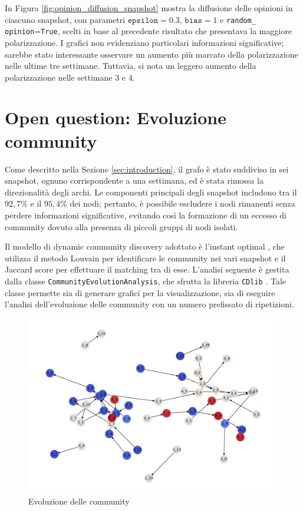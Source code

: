 \documentclass[sigchi]{acmart}
\begin{document}
In Figura \ref{fig:opinion_diffusion_snapshot} mostra la diffusione delle opinioni in ciascuno snapshot, con parametri $\texttt{epsilon}=0.3$, $\texttt{bias}=1$ e \texttt{random\_ opinion}=\texttt{True}, scelti in base al precedente risultato che presentava la maggiore polarizzazione. I grafici non evidenziano particolari informazioni significative; sarebbe stato interessante osservare un aumento più marcato della polarizzazione nelle ultime tre settimane. Tuttavia, si nota un leggero aumento della polarizzazione nelle settimane 3 e 4.

\section{Open question: Evoluzione community} \label{sec:evoluzione_community}
Come descritto nella Sezione \ref{sec:introduction}, il grafo è stato suddiviso in sei snapshot, ognuno corrispondente a una settimana, ed è stata rimossa la direzionalità degli archi. Le componenti principali degli snapshot includono tra il $92,7\%$ e il $95,4\%$ dei nodi; pertanto, è possibile escludere i nodi rimanenti senza perdere informazioni significative, evitando così la formazione di un eccesso di community dovuto alla presenza di piccoli gruppi di nodi isolati.

Il modello di dynamic community discovery adottato è l'instant optimal \cite{greene2010tracking}, che utilizza il metodo Louvain \cite{blondel2008fast} per identificare le community nei vari snapshot e il Jaccard score per effettuare il matching tra di esse. L'analisi seguente è gestita dalla classe \texttt{CommunityEvolutionAnalysis}, che sfrutta la libreria \texttt{CDlib} \cite{rossetti2019cdlib}. Tale classe permette sia di generare grafici per la visualizzazione, sia di eseguire l'analisi dell'evoluzione delle community con un numero prefissato di ripetizioni.

\begin{figure}[h]
    \centering
    \includegraphics[width=\linewidth]{img/Evoluzione_community.png}
    \caption{Evoluzione delle community} \label{fig:community}
\end{figure}
\end{document}

